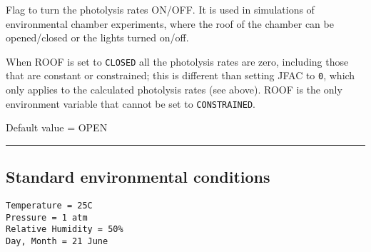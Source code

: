 Flag to turn the photolysis rates ON/OFF. It is used in simulations of
environmental chamber experiments, where the roof of the chamber can be
opened/closed or the lights turned on/off.

When ROOF is set to \texttt{CLOSED} all the photolysis rates are zero,
including those that are constant or constrained; this is different than
setting JFAC to \texttt{0}, which only applies to the calculated
photolysis rates (see above). ROOF is the only environment variable that
cannot be set to \texttt{CONSTRAINED}.

Default value = OPEN

\begin{center}\rule{0.5\linewidth}{\linethickness}\end{center}

\subsection{Standard environmental conditions}\label{standard-environmental-conditions}

\begin{verbatim}
Temperature = 25C  
Pressure = 1 atm  
Relative Humidity = 50%  
Day, Month = 21 June
\end{verbatim}
